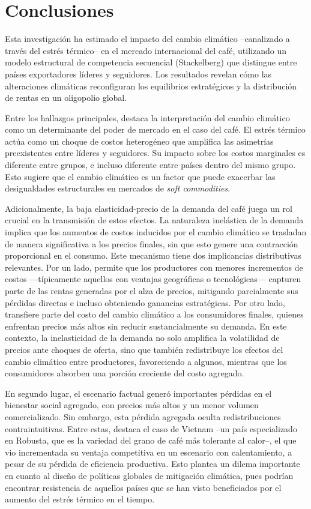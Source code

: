 \chapter{Conclusiones}

Esta investigación ha estimado el impacto del cambio climático --canalizado a través del estrés térmico-- en el mercado internacional del café, utilizando un modelo estructural de competencia secuencial (Stackelberg) que distingue entre países exportadores líderes y seguidores. Los resultados revelan cómo las alteraciones climáticas reconfiguran los equilibrios estratégicos y la distribución de rentas en un oligopolio global.

Entre los hallazgos principales, destaca la interpretación del cambio climático como un determinante del poder de mercado en el caso del café. El estrés térmico actúa como un choque de costos heterogéneo que amplifica las asimetrías preexistentes entre líderes y seguidores. Su impacto sobre los costos marginales es diferente entre grupos, e incluso diferente entre países dentro del mismo grupo. Esto sugiere que el cambio climático es un factor que puede exacerbar las desigualdades estructurales en mercados de \textit{soft commodities}.

Adicionalmente, la baja elasticidad-precio de la demanda del café juega un rol crucial en la transmisión de estos efectos. La naturaleza inelástica de la demanda implica que los aumentos de costos inducidos por el cambio climático se trasladan de manera significativa a los precios finales, sin que esto genere una contracción proporcional en el consumo. Este mecanismo tiene dos implicancias distributivas relevantes. Por un lado, permite que los productores con menores incrementos de costos —típicamente aquellos con ventajas geográficas o tecnológicas— capturen parte de las rentas generadas por el alza de precios, mitigando parcialmente sus pérdidas directas e incluso obteniendo ganancias estratégicas. Por otro lado, transfiere parte del costo del cambio climático a los consumidores finales, quienes enfrentan precios más altos sin reducir sustancialmente su demanda. En este contexto, la inelasticidad de la demanda no solo amplifica la volatilidad de precios ante choques de oferta, sino que también redistribuye los efectos del cambio climático entre productores, favoreciendo a algunos, mientras que los consumidores absorben una porción creciente del costo agregado.

En segundo lugar, el escenario factual generó importantes pérdidas en el bienestar social agregado, con precios más altos y un menor volumen comercializado. Sin embargo, esta pérdida agregada oculta redistribuciones contraintuitivas. Entre estas, destaca el caso de Vietnam --un país especializado en Robusta, que es la variedad del grano de café más tolerante al calor--, el que vio incrementada su ventaja competitiva en un escenario con calentamiento, a pesar de su pérdida de eficiencia productiva. Esto plantea un dilema importante en cuanto al diseño de políticas globales de mitigación climática, pues podrían encontrar resistencia de aquellos países que se han visto beneficiados por el aumento del estrés térmico en el tiempo.

